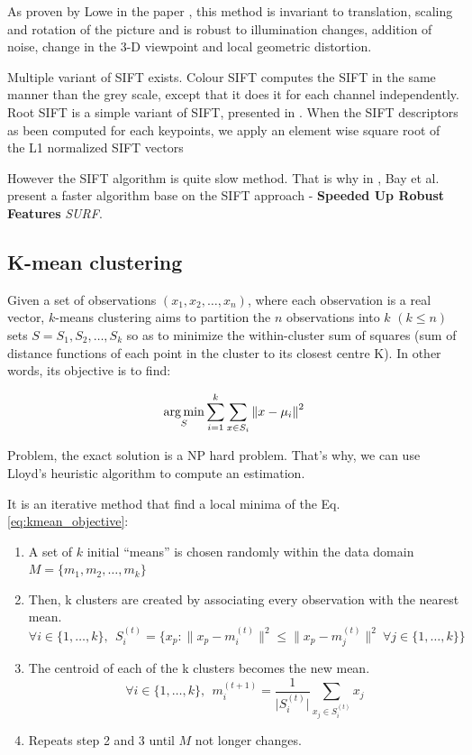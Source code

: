 As proven by Lowe in the paper \cite{Lowe2004}, this method is invariant to translation, scaling and rotation of the picture and is robust to illumination changes, addition of noise, change in the 3-D viewpoint and local geometric distortion.

Multiple variant of SIFT exists. Colour SIFT computes the SIFT in the same manner than the grey scale, except that it does it for each channel independently. Root SIFT is a simple variant of SIFT, presented in \cite{Arandjelovic2012}. When the SIFT descriptors as been computed for each keypoints, we apply an element wise square root of the L1 normalized SIFT vectors

However the SIFT algorithm is quite slow method. That is why in \cite{Bay2006}, Bay et al. present a faster algorithm base on the SIFT approach - \textbf{Speeded Up Robust Features} \textit{SURF}. 

\subsection{K-mean clustering}

Given a set of observations $(x_1, x_2, …, x_n)$, where each observation is a real vector, $k$-means clustering aims to partition the $n$ observations into $k$ $(k \leq n)$ sets $S = {S_1, S_2, …, S_k}$ so as to minimize the within-cluster sum of squares (sum of distance functions of each point in the cluster to its closest centre K). In other words, its objective is to find:

\begin{equation} \label{eq:kmean_objective}
    \underset {S}{\operatorname {arg\,min}} \sum _{i=1}^{k} \sum _{x \in S_{i}} \left\| x - \mu_{i} \right\|^{2}
\end{equation}

Problem, the exact solution is a NP hard problem. That's why, we can use Lloyd's heuristic algorithm to compute an estimation.

It is an iterative method that find a local minima of the Eq. \ref{eq:kmean_objective}:

\begin{enumerate}
    \item A set of $k$ initial \enquote{means} is chosen randomly within the data domain $M = \{m_1, m_2, \ldots, m_k \}$
    
    \item Then, k clusters are created by associating every observation with the nearest mean.
    $$ \forall i \in \{ 1, \ldots, k \}, ~~ S_{i}^{(t)}= \big \{ x_{p}:{\big \|}x_{p}-m_{i}^{(t)}{\big \|}^{2}\leq {\big \|}x_{p}-m_{j}^{(t)}{\big \|}^{2} ~ \forall j \in \{ 1, \ldots, k \} \big \}$$
    
    \item The centroid of each of the k clusters becomes the new mean.
    $$ \forall i \in \{ 1, \ldots, k \}, ~~ m_{i}^{(t+1)}=\frac {1}{\lvert S_{i}^{(t)} \rvert } \sum _{x_{j} \in S_{i}^{(t)}} x_{j} $$
    
    \item Repeats step 2 and 3 until $M$ not longer changes.
\end{enumerate}

